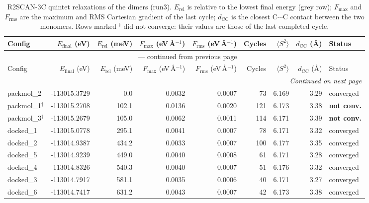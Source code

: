 
\begin{longtable}{@{}lrrrrrrrl@{}}
\caption{R2SCAN-3C quintet relaxations of the dimers (run3). $E_{\mathrm{rel}}$ is relative to the
         lowest final energy (grey row); $F_{\mathrm{max}}$ and $F_{\mathrm{rms}}$ are the maximum and RMS
         Cartesian gradient of the last cycle; $d_{\mathrm{CC}}$ is the closest C$\cdots$C contact between the
         two monomers. Rows marked $^{\dagger}$ did not converge: their values are those of the last
         completed cycle.}\label{tab:run3_relaxation}\\
\toprule
Config & $E_{\mathrm{final}}$ (eV) & $E_{\mathrm{rel}}$ (meV) & $F_{\mathrm{max}}$ (eV\,\AA$^{-1}$) &
$F_{\mathrm{rms}}$ (eV\,\AA$^{-1}$) & Cycles & $\langle S^2\rangle$ & $d_{\mathrm{CC}}$ (\AA) & Status\\
\midrule
\endfirsthead
\multicolumn{9}{c}{{\tablename}~\thetable{} --- continued from previous page}\\
\toprule
Config & $E_{\mathrm{final}}$ (eV) & $E_{\mathrm{rel}}$ (meV) & $F_{\mathrm{max}}$ (eV\,\AA$^{-1}$) &
$F_{\mathrm{rms}}$ (eV\,\AA$^{-1}$) & Cycles & $\langle S^2\rangle$ & $d_{\mathrm{CC}}$ (\AA) & Status\\
\midrule
\endhead
\midrule
\multicolumn{9}{r}{\emph{Continued on next page}}\\
\endfoot
\bottomrule
\endlastfoot
\rowcolor{gray!20} packmol\_2 & -113015.3729 & 0.0 & 0.0032 & 0.0007 & 73 & 6.169 & 3.29 & converged \\
packmol\_1$^{\dagger}$ & -113015.2708 & 102.1 & 0.0136 & 0.0020 & 121 & 6.173 & 3.38 & \textbf{not conv.} \\
packmol\_3$^{\dagger}$ & -113015.2679 & 105.0 & 0.0062 & 0.0011 & 114 & 6.171 & 3.39 & \textbf{not conv.} \\
docked\_1 & -113015.0778 & 295.1 & 0.0041 & 0.0007 & 78 & 6.171 & 3.32 & converged \\
docked\_2 & -113014.9387 & 434.2 & 0.0033 & 0.0007 & 100 & 6.177 & 3.35 & converged \\
docked\_5 & -113014.9239 & 449.0 & 0.0040 & 0.0008 & 61 & 6.171 & 3.28 & converged \\
docked\_4 & -113014.8326 & 540.3 & 0.0040 & 0.0007 & 51 & 6.176 & 3.32 & converged \\
docked\_3 & -113014.7917 & 581.1 & 0.0035 & 0.0006 & 40 & 6.171 & 3.27 & converged \\
docked\_6 & -113014.7417 & 631.2 & 0.0043 & 0.0007 & 42 & 6.173 & 3.38 & converged \\
\end{longtable}
